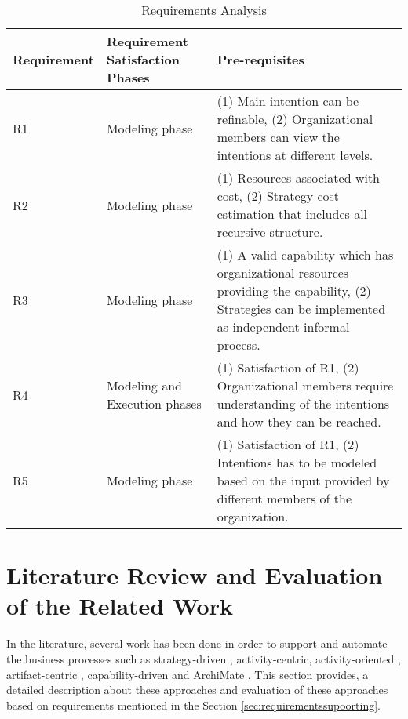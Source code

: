 \begin{table} [htbp]
	\centering
	\begin{tabular} {p{2.5cm}p{3cm}p{8cm}}
		\toprule
		\textbf{Requirement} & \textbf{Requirement Satisfaction Phases} & \textbf{Pre-requisites}    \\
		\midrule                                                                                                               
		R1    & Modeling phase    &(1) Main intention can be refinable, (2) Organizational members can view the intentions at different levels.    \\ 
		
		R2   & Modeling phase    &(1) Resources associated with cost, (2) Strategy cost estimation that includes all recursive structure. \\         
			
		R3   & Modeling phase       &(1) A valid capability which has organizational resources providing the capability, (2) Strategies can be implemented as independent informal process. \\      
		
		R4   & Modeling and Execution phases     &(1) Satisfaction of R1, (2) Organizational members require understanding of the intentions and how they can be reached. \\                         
			
		R5  &Modeling phase  &(1) Satisfaction of R1, (2) Intentions has to be modeled based on the input provided by different members of the organization.               \\ 
		    
		\bottomrule
	\end{tabular}
	\caption{Requirements Analysis}
	\label{tab:subrequirements}
\end{table}

\section{Literature Review and Evaluation of the Related Work}
\label{sec:literaturereview}
In the literature, several work has been done in order to support and automate the business processes such as strategy-driven \cite{Bider2005}, activity-centric\cite{Yarosh2009}, activity-oriented \cite{Leymann2000}, artifact-centric \cite{Cohn2009}, capability-driven \cite{Stirna2012} and ArchiMate \cite{Group2012}. This section provides, a detailed description about these approaches and evaluation of these approaches based on requirements mentioned in the Section \ref{sec:requirementssupoorting}. 


